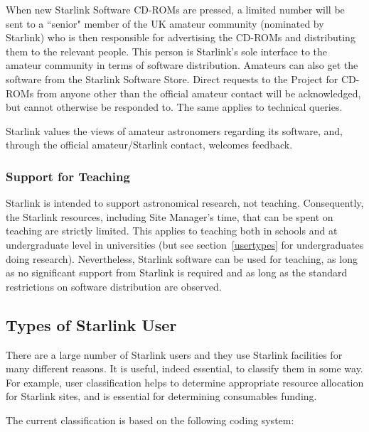 When new Starlink Software CD-ROMs are pressed, a limited number will be
sent to a ``senior" member of the UK amateur community (nominated by Starlink)
who is then responsible for advertising the CD-ROMs and distributing them to the
relevant people.
This person is Starlink's sole interface to the amateur community in terms of
software distribution.
Amateurs can also get the software from the Starlink Software Store.
Direct requests to the Project for CD-ROMs from anyone other than the official
amateur contact will be acknowledged, but cannot otherwise be responded to.
The same applies to technical queries.

Starlink values the views of amateur astronomers regarding its software, and,
through the official amateur/Starlink contact, welcomes feedback.

\subsubsection{\label{teaching}Support for Teaching}

Starlink is intended to support astronomical research, not teaching.
Consequently, the Starlink resources, including Site Manager's time, that can
be spent on teaching are strictly limited.
This applies to teaching both in schools and at undergraduate level in
universities (but see section~\ref{usertypes} for undergraduates doing
research).
Nevertheless, Starlink software can be used for teaching, as long as no
significant support from Starlink is required and as long as the standard
restrictions on software distribution are observed.

\subsection{\label{usertypes}Types of Starlink User}

There are a large number of Starlink users and they use Starlink facilities
for many different reasons.
It is useful, indeed essential, to classify them in some way.
For example, user classification helps to determine appropriate resource
allocation for Starlink sites, and is essential for determining consumables
funding.

The current classification is based on the following coding system:

